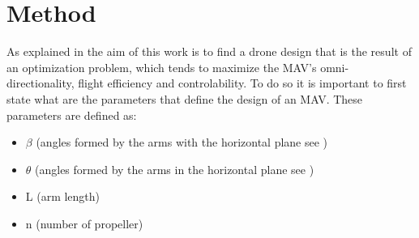 \chapter{Method}
\label{sec:method}
As explained in  the aim of this work is to find a drone
design that is the result of an optimization problem, which tends to maximize the
MAV's omni-directionality, flight efficiency and controlability. To do so it is
important to first state what are the parameters that define the design of an MAV.
These parameters are defined as:

\begin{itemize}
\item $\beta$  (angles formed by the arms with the horizontal plane see )
\item $\theta$ (angles formed by the arms in the horizontal plane see )
\item L (arm length)
\item n (number of propeller)
\end{itemize}

